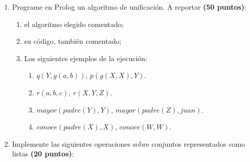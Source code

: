 \begin{enumerate}
    \item Programe en Prolog un algoritmo de unificación. A reportar \textbf{(50 puntos)}:
    \begin{enumerate}
        \item el algoritmo elegido comentado;
        \item su código, también comentado;
        \item Los siguientes ejemplos de la ejecución:
        \begin{enumerate}
            \item $q(Y, g(a, b))$, $p(g(X, X), Y)$.
            \item $r(a, b, c)$, $r(X, Y, Z)$.
            \item $mayor(padre(Y), Y)$, $mayor(padre(Z), juan)$.
            \item $conoce(padre(X), X)$, $conoce(W, W)$.
        \end{enumerate}
    \end{enumerate}
    \item Implemente las siguientes operaciones sobre conjuntos representados como listas \textbf{(20 puntos)}:
    \begin{itemize}
        \item Subconjunto:
        \begin{verbatim}
            ?- subset([1,3], [1,2,3,4]).
            true.
            ?- subset([], [1,2]).
            true.
        \end{verbatim}
        \item Intersección:
        \begin{verbatim}
            ?- inter([1,2,3], [2,3,4], L).
            L = [2, 3].
        \end{verbatim}
        \item Unión:
        \begin{minted}[
            frame=none,

\end{verbatim}
\end{itemize}
\end{enumerate}
